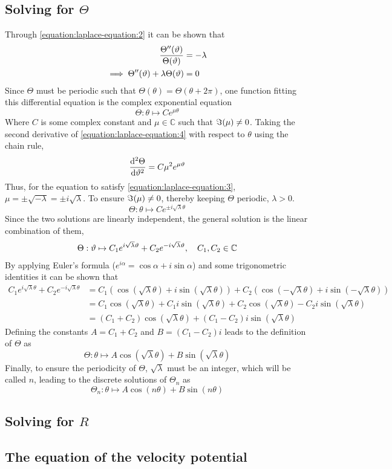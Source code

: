 \subsection{Solving for $\Theta$}
Through \eqref{equation:laplace-equation:2} it can be shown that
\begin{align}
    \notag\frac{\Theta''(\theta)}{\Theta(\theta)}&=-\lambda\\
    \label{equation:laplace-equation:3}\implies\Theta''(\theta)+\lambda\Theta(\theta)&=0
\end{align}
Since $\Theta$ must be periodic such that $\Theta(\theta)=\Theta(\theta+2\pi)$, one function fitting this differential equation is
the complex exponential equation
\begin{equation}
    \label{equation:laplace-equation:4}\Theta:\theta\mapsto Ce^{\mu\theta}
\end{equation}
Where $C$ is some complex constant and $\mu\in\mathbb{C}$ such that $\imaginary(\mu)\neq0$. Taking the second derivative of \eqref{equation:laplace-equation:4} with respect to $\theta$ using the chain rule,
$$
    \dv[2]{\Theta}{\theta}=C\mu^2e^{\mu\theta}
$$
Thus, for the equation to satisfy \eqref{equation:laplace-equation:3}, $\mu=\pm\sqrt{-\lambda}=\pm i\sqrt{\lambda}$. To ensure
$\imaginary(\mu)\neq0$, thereby keeping $\Theta$ periodic, $\lambda>0$.
$$
    \Theta:\theta\mapsto Ce^{\pm i\sqrt{\lambda}\theta}
$$
Since the two solutions are linearly independent, the general solution is the linear combination of them,
\begin{align*}
    \Theta:\theta\mapsto C_1e^{i\sqrt{\lambda}\theta}+C_2e^{-i\sqrt{\lambda}\theta}\qc C_1,C_2\in\mathbb{C}
\end{align*}
By applying Euler's formula ($e^{i\alpha}=\cos\alpha+i\sin\alpha$) and some trigonometric identities it can be shown that
\begin{align*}
    C_1e^{i\sqrt{\lambda}\theta}+C_2e^{-i\sqrt{\lambda}\theta}&=C_1\left(\cos\left(\sqrt{\lambda}\theta\right)+i\sin\left(\sqrt{\lambda}\theta\right)\right)+C_2\left(\cos\left(-\sqrt{\lambda}\theta\right)+i\sin\left(-\sqrt{\lambda}\theta\right)\right)\\
    &=C_1\cos\left(\sqrt{\lambda}\theta\right)+C_1i\sin\left(\sqrt{\lambda}\theta\right)+C_2\cos\left(\sqrt{\lambda}\theta\right)-C_2i\sin\left(\sqrt{\lambda}\theta\right)\\
    &=\left(C_1+C_2\right)\cos\left(\sqrt{\lambda}\theta\right)+\left(C_1-C_2\right)i\sin\left(\sqrt{\lambda}\theta\right)
\end{align*}
Defining the constants $A=C_1+C_2$ and $B=(C_1-C_2)i$ leads to the definition of $\Theta$ as
$$
    \Theta:\theta\mapsto A\cos\left(\sqrt{\lambda}\theta\right)+B\sin\left(\sqrt{\lambda}\theta\right)
$$
Finally, to ensure the periodicity of $\Theta$, $\sqrt{\lambda}$ must be an integer, which will be called $n$, leading to the discrete solutions of $\Theta_n$ as
$$
    \Theta_n:\theta\mapsto A\cos\left(n\theta\right)+B\sin\left(n\theta\right)
$$

\subsection{Solving for $R$}

\subsection{The equation of the velocity potential}